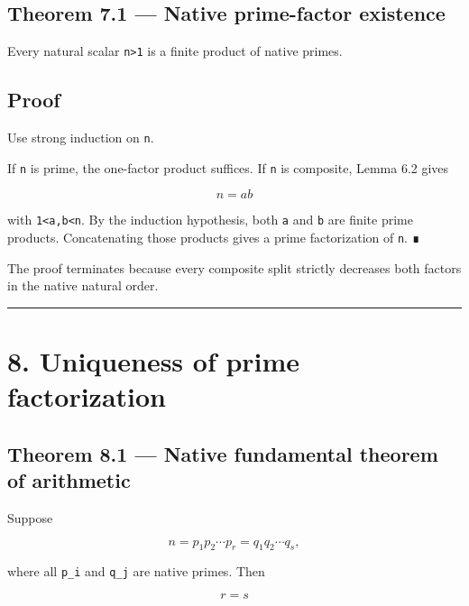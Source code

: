 \hypertarget{theorem-7.1-native-prime-factor-existence}{%
\subsection{Theorem 7.1 --- Native prime-factor existence}\label{theorem-7.1-native-prime-factor-existence}}

Every natural scalar \texttt{n\textgreater{}1} is a finite product of native primes.

\hypertarget{proof-8}{%
\subsection{Proof}\label{proof-8}}

Use strong induction on \texttt{n}.

If \texttt{n} is prime, the one-factor product suffices. If \texttt{n} is composite, Lemma 6.2
gives

\[
n=ab
\]

with \texttt{1\textless{}a,b\textless{}n}. By the induction hypothesis, both \texttt{a} and \texttt{b} are finite prime
products. Concatenating those products gives a prime factorization of \texttt{n}. ∎

The proof terminates because every composite split strictly decreases both
factors in the native natural order.

\begin{center}\rule{0.5\linewidth}{0.5pt}\end{center}

\hypertarget{uniqueness-of-prime-factorization}{%
\section{8. Uniqueness of prime factorization}\label{uniqueness-of-prime-factorization}}

\hypertarget{theorem-8.1-native-fundamental-theorem-of-arithmetic}{%
\subsection{Theorem 8.1 --- Native fundamental theorem of arithmetic}\label{theorem-8.1-native-fundamental-theorem-of-arithmetic}}

Suppose

\[
n=p_1p_2\cdots p_r
=q_1q_2\cdots q_s,
\]

where all \texttt{p\_i} and \texttt{q\_j} are native primes. Then

\[
r=s
\]

